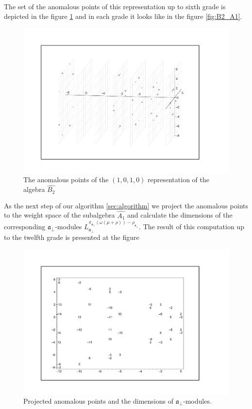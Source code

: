 \documentclass[a4paper,12pt]{article}
\theoremstyle{definition} \newtheorem{Def}{Definition}
\begin{document}
The set of the anomalous points of this representation up to sixth grade is depicted in the figure \ref{fig:affine_B2_anom_point} and in each grade it looks like in the figure \ref{fig:B2_A1}. 

\begin{figure}[ph]
  \includegraphics[width=160mm]{AffineB2_A1_Anom.pdf}
  \caption{The anomalous points of the $(1,0,1,0)$ representation of the algebra $\hat{B_2}$}
  \label{fig:affine_B2_anom_point}
\end{figure}

As the next step of our algorithm \ref{sec:algorithm} we project the anomalous points to the weight space of the subalgebra $\hat{A_1}$ and calculate the dimensions of the corresponding $\mathfrak{a}_{\bot}$-modules $L^{\pi_{\mathfrak{a}_{\bot}}(\omega(\mu+\rho))-\rho_{\mathfrak{a}_{\bot}}}_{\mathfrak{a}_{\bot}}$.
The result of this computation up to the twelfth grade is presented at the figure
\begin{figure}[ph]
  \centering
  \includegraphics[width=150mm]{AffineB2_A1_proj_anom.pdf}
  \caption{Projected anomalous points and the dimensions of $\mathfrak{a}_{\bot}$-modules.}
  \label{fig:AffineB2_A1_anom_proj}
\end{figure}
\end{document}
